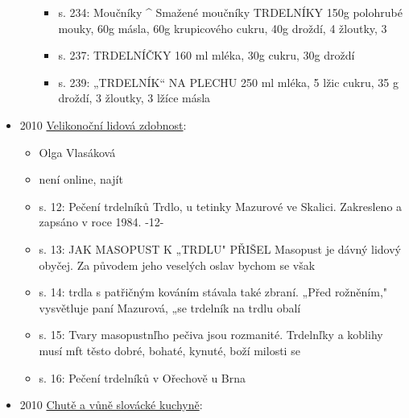 \begin{itemize}
\begin{itemize}
    \begin{itemize}
    \tightlist
    \item
      s. 234: Moučníky \^{} Smažené moučníky TRDELNÍKY 150g polohrubé
      mouky, 60g másla, 60g krupicového cukru, 40g droždí, 4 žloutky, 3
    \item
      s. 237: TRDELNÍČKY 160 ml mléka, 30g cukru, 30g droždí
    \item
      s. 239: „TRDELNÍK`` NA PLECHU 250 ml mléka, 5 lžic cukru, 35 g
      droždí, 3 žloutky, 3 lžíce másla
    \end{itemize}
  \end{itemize}
\item
  2010
  \href{https://ceskadigitalniknihovna.cz/uuid/uuid:553c58c0-69fe-11eb-9f97-005056827e51}{Velikonoční
  lidová zdobnost}:

  \begin{itemize}
  \tightlist
  \item
    Olga Vlasáková
  \item
    není online, najít
  \item
    s. 12: Pečení trdelníků Trdlo, u tetinky Mazurové ve Skalici.
    Zakresleno a zapsáno v roce 1984. -12-
  \item
    s. 13: JAK MASOPUST K „TRDLU" PŘIŠEL Masopust je dávný lidový
    obyčej. Za původem jeho veselých oslav bychom se však
  \item
    s. 14: trdla s patřičným kováním stávala také zbraní. „Před
    rožněním," vysvětluje paní Mazurová, „se trdelník na trdlu obalí
  \item
    s. 15: Tvary masopustnľho pečiva jsou rozmanité. Trdelnľky a koblihy
    musí mft těsto dobré, bohaté, kynuté, boží milosti se
  \item
    s. 16: Pečení trdelníků v Ořechově u Brna
  \end{itemize}
\item
  2010
  \href{https://ceskadigitalniknihovna.cz/uuid/uuid:1b8fd480-8ee4-11ea-ae16-005056827e52}{Chutě
  a vůně slovácké kuchyně}:


\end{itemize}
